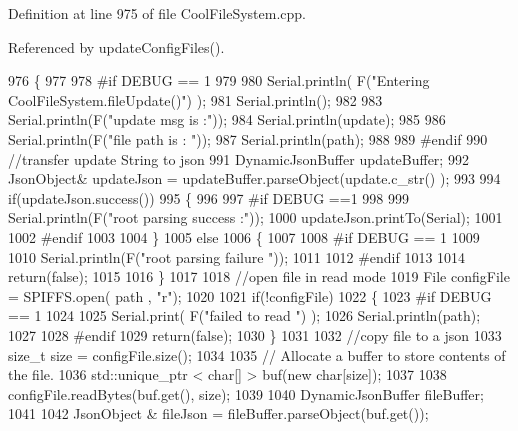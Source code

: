 Definition at line 975 of file Cool\+File\+System.\+cpp.



Referenced by update\+Config\+Files().


\begin{DoxyCode}
976 \{
977 
978 \textcolor{preprocessor}{#if DEBUG == 1}
979 
980     Serial.println( F(\textcolor{stringliteral}{"Entering CoolFileSystem.fileUpdate()"}) );
981     Serial.println();
982     
983     Serial.println(F(\textcolor{stringliteral}{"update msg is :"}));
984     Serial.println(update);
985     
986     Serial.println(F(\textcolor{stringliteral}{"file path is : "}));
987     Serial.println(path);   
988 
989 \textcolor{preprocessor}{#endif}
990     \textcolor{comment}{//transfer update String to json}
991     DynamicJsonBuffer updateBuffer;
992     JsonObject& updateJson = updateBuffer.parseObject(update.c\_str() );
993     
994     \textcolor{keywordflow}{if}(updateJson.success())
995     \{
996     
997 \textcolor{preprocessor}{    #if DEBUG ==1}
998         
999         Serial.println(F(\textcolor{stringliteral}{"root parsing success :"}));
1000         updateJson.printTo(Serial);
1001     
1002 \textcolor{preprocessor}{    #endif}
1003 
1004     \}
1005     \textcolor{keywordflow}{else}
1006     \{
1007     
1008 \textcolor{preprocessor}{    #if DEBUG == 1 }
1009     
1010         Serial.println(F(\textcolor{stringliteral}{"root parsing failure "}));
1011     
1012 \textcolor{preprocessor}{    #endif}
1013         
1014         \textcolor{keywordflow}{return}(\textcolor{keyword}{false});  
1015 
1016     \}
1017     
1018     \textcolor{comment}{//open file in read mode}
1019     File configFile = SPIFFS.open( path , \textcolor{stringliteral}{"r"});
1020     
1021     \textcolor{keywordflow}{if}(!configFile)
1022     \{   
1023 \textcolor{preprocessor}{    #if DEBUG == 1}
1024         
1025         Serial.print( F(\textcolor{stringliteral}{"failed to read "}) );
1026         Serial.println(path);
1027 
1028 \textcolor{preprocessor}{    #endif}
1029         \textcolor{keywordflow}{return}(\textcolor{keyword}{false});
1030     \}
1031 
1032     \textcolor{comment}{//copy file to a json}
1033     \textcolor{keywordtype}{size\_t} size = configFile.size();
1034 
1035     \textcolor{comment}{// Allocate a buffer to store contents of the file.}
1036     std::unique\_ptr < char[] > buf(\textcolor{keyword}{new} \textcolor{keywordtype}{char}[size]);
1037 
1038     configFile.readBytes(buf.get(), size);
1039 
1040     DynamicJsonBuffer fileBuffer;
1041 
1042     JsonObject & fileJson = fileBuffer.parseObject(buf.get());

\end{DoxyCode}
